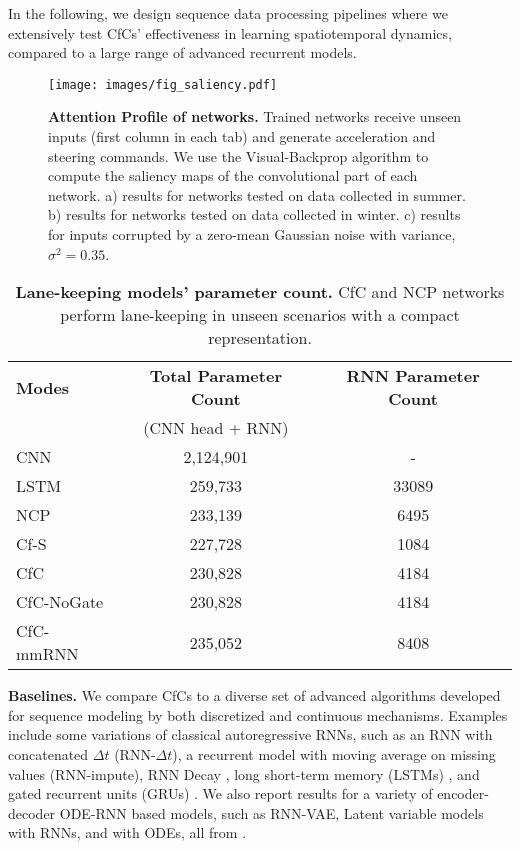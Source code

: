 \documentclass[12pt]{article}
\begin{document}
In the following, we design sequence data processing pipelines where we extensively test CfCs' effectiveness in learning spatiotemporal dynamics, compared to a large range of advanced recurrent models. 

\begin{figure}[t]
	\centering
	\texttt{[image: images/fig\_saliency.pdf]}
	\caption{\textbf{Attention Profile of networks.} Trained networks receive unseen inputs (first column in each tab) and generate acceleration and steering commands. We use the Visual-Backprop algorithm \cite{bojarski2018visualbackprop} to compute the saliency maps of the convolutional part of each network. a) results for networks tested on data collected in summer. b) results for networks tested on data collected in winter. c) results for inputs corrupted by a zero-mean Gaussian noise with variance, $\sigma^2 = 0.35$.}
	\label{fig:saliency}
\end{figure}

\begin{table}[t]
    \centering
        \caption{\textbf{Lane-keeping models' parameter count.} CfC and NCP networks perform lane-keeping in unseen scenarios with a compact representation.}
    \begin{tabular}{lcc}
    \toprule
        \textbf{Modes} &  \textbf{Total Parameter Count} & \textbf{RNN Parameter Count}\\
        & (CNN head + RNN) & \\
         \midrule
CNN & 2,124,901 & - \\
LSTM & 259,733 & 33089 \\
NCP & 233,139 & 6495 \\
Cf-S & 227,728 & 1084 \\
CfC & 230,828 & 4184\\
CfC-NoGate & 230,828 & 4184\\
CfC-mmRNN & 235,052 & 8408 \\
         \bottomrule
    \end{tabular}
    \label{tab:param_count}
\end{table}

\noindent \textbf{Baselines.}
We compare CfCs to a diverse set of advanced algorithms developed for sequence modeling by both discretized and continuous mechanisms. Examples include some variations of classical autoregressive RNNs, such as an RNN with concatenated $\Delta t$ (RNN-$\Delta t$), a recurrent model with moving average on missing values (RNN-impute), RNN Decay \cite{rubanova2019latent}, long short-term memory (LSTMs) \cite{hochreiter1997long}, and gated recurrent units (GRUs) \cite{chung2014empirical}. We also report results for a variety of encoder-decoder ODE-RNN based models, such as RNN-VAE, Latent variable models with RNNs, and with ODEs, all from \cite{rubanova2019latent}. 
\end{document}
